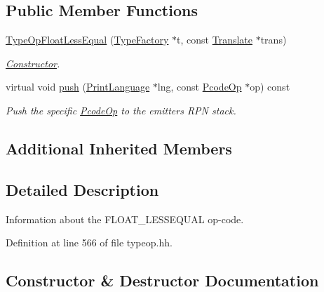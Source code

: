 \subsection*{Public Member Functions}
\begin{DoxyCompactItemize}
\item 
\mbox{\hyperlink{class_type_op_float_less_equal_acbd4ef67b2c3c93f4774b64b0f83e24f}{Type\+Op\+Float\+Less\+Equal}} (\mbox{\hyperlink{class_type_factory}{Type\+Factory}} $\ast$t, const \mbox{\hyperlink{class_translate}{Translate}} $\ast$trans)
\begin{DoxyCompactList}\small\item\em \mbox{\hyperlink{class_constructor}{Constructor}}. \end{DoxyCompactList}\item 
virtual void \mbox{\hyperlink{class_type_op_float_less_equal_a9af8f29788c448390fb9ee38a3060562}{push}} (\mbox{\hyperlink{class_print_language}{Print\+Language}} $\ast$lng, const \mbox{\hyperlink{class_pcode_op}{Pcode\+Op}} $\ast$op) const
\begin{DoxyCompactList}\small\item\em Push the specific \mbox{\hyperlink{class_pcode_op}{Pcode\+Op}} to the emitter\textquotesingle{}s R\+PN stack. \end{DoxyCompactList}\end{DoxyCompactItemize}
\subsection*{Additional Inherited Members}


\subsection{Detailed Description}
Information about the F\+L\+O\+A\+T\+\_\+\+L\+E\+S\+S\+E\+Q\+U\+AL op-\/code. 

Definition at line 566 of file typeop.\+hh.



\subsection{Constructor \& Destructor Documentation}
\mbox{\label{class_type_op_float_less_equal_acbd4ef67b2c3c93f4774b64b0f83e24f}} 
